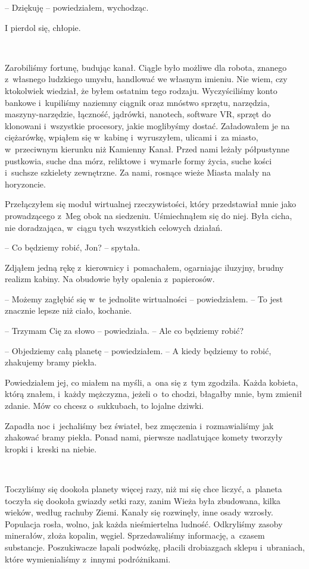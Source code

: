 \documentclass[oneside,polish,11pt,sfheadings]{mwbk}
\begin{document}
-- Dziękuję -- powiedziałem, wychodząc.

I pierdol się, chłopie.

~

Zarobiliśmy fortunę, budując kanał. Ciągle było możliwe dla robota,
znanego z~własnego ludzkiego umysłu, handlować we własnym imieniu. Nie
wiem, czy ktokolwiek wiedział, że byłem ostatnim tego rodzaju.
Wyczyściliśmy konto bankowe i~kupiliśmy naziemny ciągnik oraz mnóstwo
sprzętu, narzędzia, maszyny-narzędzie, łączność, jądrówki, nanotech,
software VR, sprzęt do klonowani i~wszystkie procesory, jakie moglibyśmy
dostać. Załadowałem je na ciężarówkę, wpiąłem się w~kabinę i~wyruszyłem,
ulicami i~za miasto, w~przeciwnym kierunku niż Kamienny Kanał. Przed
nami leżały półpustynne pustkowia, suche dna mórz, reliktowe i~wymarłe
formy życia, suche kości i~suchsze szkielety zewnętrzne. Za nami,
rosnące wieże Miasta malały na horyzoncie.

Przełączyłem się moduł wirtualnej rzeczywistości, który przedstawiał
mnie jako prowadzącego z~Meg obok na siedzeniu. Uśmiechnąłem się do
niej. Była cicha, nie doradzająca, w~ciągu tych wszystkich celowych
działań.

-- Co będziemy robić, Jon? -- spytała.

Zdjąłem jedną rękę z~kierownicy i~pomachałem, ogarniając iluzyjny,
brudny realizm kabiny. Na obudowie były opalenia z~papierosów. 

-- Możemy
zagłębić się w~te jednolite wirtualności -- powiedziałem. -- To jest
znacznie lepsze niż ciało, kochanie.

-- Trzymam Cię za słowo -- powiedziała. -- Ale co będziemy robić?

-- Objedziemy całą planetę -- powiedziałem. -- A kiedy będziemy to robić,
zhakujemy bramy piekła.

Powiedziałem jej, co miałem na myśli, a~ona się z~tym zgodziła. Każda
kobieta, którą znałem, i~każdy mężczyzna, jeżeli o~to chodzi, błagałby
mnie, bym zmienił zdanie. Mów co chcesz o~sukkubach, to lojalne dziwki.

Zapadła noc i~jechaliśmy bez świateł, bez zmęczenia i~rozmawialiśmy jak
zhakować bramy piekła. Ponad nami, pierwsze nadlatujące komety tworzyły
kropki i~kreski na niebie.

~

Toczyliśmy się dookoła planety więcej razy, niż mi się chce liczyć, a~planeta toczyła się dookoła gwiazdy setki razy, zanim Wieża była
zbudowana, kilka wieków, według rachuby Ziemi. Kanały się rozwinęły,
inne osady wzrosły. Populacja rosła, wolno, jak każda nieśmiertelna
ludność. Odkryliśmy zasoby minerałów, złoża kopalin, węgiel.
Sprzedawaliśmy informację, a~czasem substancje. Poszukiwacze łapali
podwózkę, płacili drobiazgach sklepu i~ubraniach, które wymienialiśmy z~innymi podróżnikami.
\end{document}
